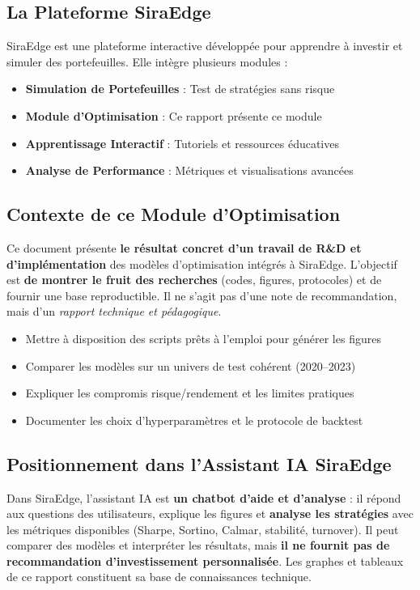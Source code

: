 \documentclass[11pt,a4paper]{article}
\begin{document}
\subsection*{La Plateforme SiraEdge}
SiraEdge est une plateforme interactive développée pour apprendre à investir et simuler des portefeuilles. Elle intègre plusieurs modules :
\begin{itemize}
    \item \textbf{Simulation de Portefeuilles} : Test de stratégies sans risque
    \item \textbf{Module d'Optimisation} : Ce rapport présente ce module
    \item \textbf{Apprentissage Interactif} : Tutoriels et ressources éducatives
    \item \textbf{Analyse de Performance} : Métriques et visualisations avancées
\end{itemize}

\subsection*{Contexte de ce Module d'Optimisation}
Ce document présente \textbf{le résultat concret d'un travail de R\&D et d'implémentation} des modèles d'optimisation intégrés à SiraEdge. L'objectif est \textbf{de montrer le fruit des recherches} (codes, figures, protocoles) et de fournir une base reproductible. Il ne s'agit pas d'une note de recommandation, mais d'un \emph{rapport technique et pédagogique}.

\begin{itemize}
    \item Mettre à disposition des scripts prêts à l'emploi pour générer les figures
    \item Comparer les modèles sur un univers de test cohérent (2020--2023)
    \item Expliquer les compromis risque/rendement et les limites pratiques
    \item Documenter les choix d'hyperparamètres et le protocole de backtest
\end{itemize}

\subsection*{Positionnement dans l'Assistant IA SiraEdge}
Dans SiraEdge, l'assistant IA est \textbf{un chatbot d'aide et d'analyse} : il répond aux questions des utilisateurs, explique les figures et \textbf{analyse les stratégies} avec les métriques disponibles (Sharpe, Sortino, Calmar, stabilité, turnover). Il peut comparer des modèles et interpréter les résultats, mais \textbf{il ne fournit pas de recommandation d'investissement personnalisée}. Les graphes et tableaux de ce rapport constituent sa base de connaissances technique.
\end{document}
